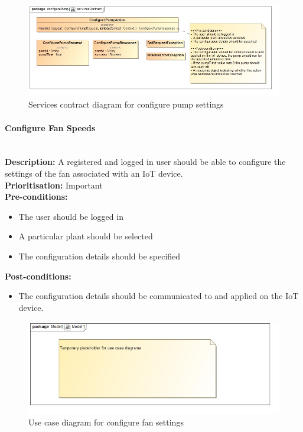 \documentclass{article}
\begin{document}
		\begin{figure}[H]
			\includegraphics[width=\linewidth]{images/ServicesContracts/configurePump.jpg}
			\caption{Services contract diagram for configure pump settings}
		\end{figure}
	
	\paragraph{Configure Fan Speeds}\mbox{}\\
		\textbf{Description:} A registered and logged in user should be able to configure the settings of the fan associated with an IoT device.\\
		\textbf{Prioritisation:} Important\\		
		\textbf{Pre-conditions:}
			\begin{itemize}
				\item The user should be logged in
				\item A particular plant should be selected
				\item The configuration details should be specified
			\end{itemize}
		\textbf{Post-conditions:}
			\begin{itemize}
				\item The configuration details should be communicated to and applied on the IoT device.
			\end{itemize}

		\begin{figure}[H]
			\includegraphics[width=\linewidth]{images/tempUseCase.jpg}
			\caption{Use case diagram for configure fan settings}
		\end{figure}
		
\end{document}

